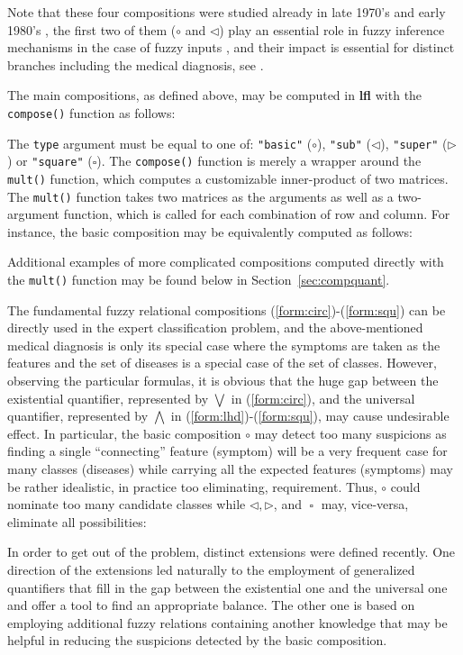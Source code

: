 \documentclass[review]{elsarticle}
\newcommand{\pkg}[1]{\textbf{#1}}
\newcommand{\code}[1]{\texttt{#1}}
\newcommand{\squ}{\mathop{\scriptstyle \square}\nolimits}
\begin{document}
Note that these four compositions were studied already in late 1970's and early 1980's \citep{BandlerKohout78, BandlerKohout80}, the first two of them ($\circ$ and $\lhd$) play an essential role in fuzzy inference mechanisms in the case of fuzzy inputs \citep{Pedrycz,Di-Nola_Pedrycz_Sessa_1989,StepBaluIEEE}, and their impact is essential for distinct branches including the medical diagnosis, see \cite{Mak:JMS2015}. 


The main compositions, as defined above,  may be computed in \pkg{lfl} with the \code{compose()} function as follows:
%

%
The \code{type} argument must be equal to one of: \code{"basic"} ($\circ$), \code{"sub"} ($\lhd$), \code{"super"} ($\rhd$) or \code{"square"} ($\square$). The \code{compose()} function is merely a wrapper around the \code{mult()} function, which computes a customizable inner-product of two matrices. The \code{mult()} function takes two matrices as the arguments as well as a two-argument function, which is called for each combination of row and column. For instance, the basic composition may be equivalently computed as follows:
%

%
Additional examples of more complicated compositions computed directly with the \code{mult()} function may be found below in Section~\ref{sec:compquant}.


The fundamental fuzzy relational compositions (\ref{form:circ})-(\ref{form:squ}) can be directly used in the expert classification problem, and the above-mentioned medical diagnosis \citep{Mak:JMS2015} is only its special case where the symptoms are taken as the features and the set of diseases is a special case of the set of classes. However, observing the particular formulas, it is obvious that the huge gap between the existential quantifier, represented by $\bigvee$ in (\ref{form:circ}), and the universal quantifier, represented by $\bigwedge$ in (\ref{form:lhd})-(\ref{form:squ}), may cause undesirable effect. In particular, the basic composition $\circ$ may detect too many suspicions as finding a single ``connecting'' feature (symptom) will be a very frequent case for many classes (diseases) while carrying all the expected features (symptoms) may be rather idealistic, in practice too eliminating, requirement. Thus, $\circ$ could nominate too many candidate classes while $\lhd, \rhd$, and $\squ$ may, vice-versa, eliminate all possibilities:

%



In order to get out of the problem, distinct extensions were defined recently. One direction of the extensions led naturally to the employment of generalized quantifiers that fill in the gap between the existential one and the universal one and offer a tool to find an appropriate balance. The other one is based on employing additional fuzzy relations containing another knowledge that may be helpful in reducing the suspicions detected by the basic composition.
\end{document}
